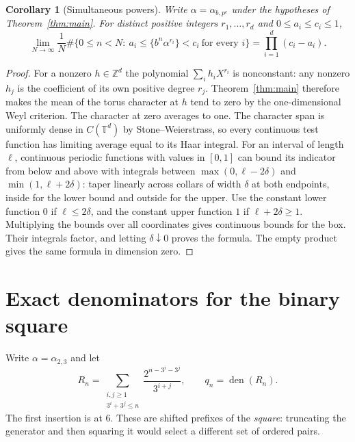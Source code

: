 \documentclass[11pt]{article}
\newtheorem{corollary}[theorem]{Corollary}
\newcommand{\Z}{\mathbb Z}
\newcommand{\T}{\mathbb T}
\DeclareMathOperator{\den}{den}
\begin{document}
\begin{corollary}[Simultaneous powers]\label{cor:joint}
Write $\alpha=\alpha_{b,p^e}$ under the hypotheses of Theorem~\ref{thm:main}.
For distinct positive integers $r_1,\ldots,r_d$ and $0\le a_i\le c_i\le1$,
\[
 \lim_{N\to\infty}\frac1N\#\{0\le n<N:\ a_i\le\{b^n\alpha^{r_i}\}<c_i
                    \ \text{for every } i\}
       =\prod_{i=1}^d(c_i-a_i).
\]
\end{corollary}
\begin{proof}
For a nonzero $h\in\Z^d$ the polynomial $\sum_i h_i X^{r_i}$ is nonconstant:
any nonzero $h_j$ is the coefficient of its own positive degree $r_j$. Theorem~\ref{thm:main}
therefore makes the mean of the torus character at $h$ tend to zero by the
one-dimensional Weyl criterion. The character at zero averages to one.
The character span is uniformly dense in $C(\T^d)$ by Stone--Weierstrass, so
every continuous test function has limiting average equal to its Haar integral.
For an interval of length $\ell$, continuous periodic functions with values in $[0,1]$
can bound its indicator from below and above with integrals between
$\max(0,\ell-2\delta)$ and $\min(1,\ell+2\delta)$: taper linearly across collars of
width $\delta$ at both endpoints, inside for the lower bound and outside for the upper.
Use the constant lower function $0$ if $\ell\le2\delta$, and the constant upper
function $1$ if $\ell+2\delta\ge1$.
Multiplying the bounds over all coordinates gives continuous bounds for the box.
Their integrals factor, and letting $\delta\downarrow0$ proves the formula.
The empty product gives the same formula in dimension zero.
\end{proof}

\begin{table}[ht]
\centering
\caption{Exact counts of simultaneous two-bit words for $\alpha_{2,3}$ and
$\alpha_{2,3}^2$ at the first 4096 starting positions.
The limiting proportion in each cell is $1/16$ by Corollary~\ref{cor:joint}.}
\end{table}

\section{Exact denominators for the binary square}

Write $\alpha=\alpha_{2,3}$ and let
\[
 R_n=\sum_{\substack{i,j\ge1\\3^i+3^j\le n}}
              \frac{2^{n-3^i-3^j}}{3^{i+j}},\qquad q_n=\den(R_n).
\]
The first insertion is at $6$. These are shifted prefixes of the \emph{square}:
truncating the generator and then squaring it would select a different set of ordered pairs.
\end{document}
